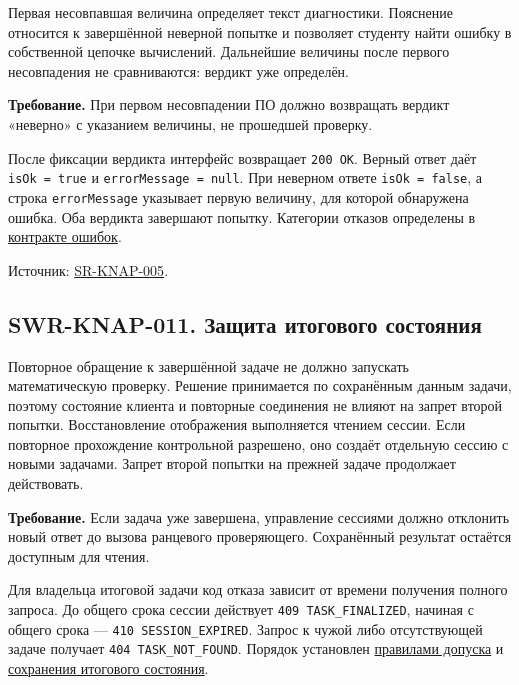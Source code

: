 \documentclass[12pt,a4paper]{article}
\begin{document}
\hypertarget{swr-knap-010-диагностика-неверной-величины}{}

\hypertarget{swr-knap-010}{}

Первая несовпавшая величина определяет текст диагностики. Пояснение относится к завершённой неверной попытке и позволяет студенту найти ошибку в собственной цепочке вычислений. Дальнейшие величины после первого несовпадения не сравниваются: вердикт уже определён.

\textbf{Требование.} При первом несовпадении ПО должно возвращать вердикт «неверно» с указанием величины, не прошедшей проверку.

После фиксации вердикта интерфейс возвращает \texttt{200\ OK}. Верный ответ даёт \texttt{isOk\ =\ true} и \texttt{errorMessage\ =\ null}. При неверном ответе \texttt{isOk\ =\ false}, а строка \texttt{errorMessage} указывает первую величину, для которой обнаружена ошибка. Оба вердикта завершают попытку. Категории отказов определены в {\href{DOC-06.2\_Сессии\_задач\_и\_планировщик.pdf\#коды-и-представление-ошибок}{контракте ошибок}}.

Источник: {\href{../04\_Системные\_требования/DOC-05\_Системные\_требования.pdf\#sr-knap-005}{SR-KNAP-005}}.

\subsection{SWR-KNAP-011. Защита итогового состояния}\label{swr-knap-011-ux437ux430ux449ux438ux442ux430-ux438ux442ux43eux433ux43eux432ux43eux433ux43e-ux441ux43eux441ux442ux43eux44fux43dux438ux44f}

\hypertarget{swr-knap-011-защита-итогового-состояния}{}

\hypertarget{swr-knap-011}{}

Повторное обращение к завершённой задаче не должно запускать математическую проверку. Решение принимается по сохранённым данным задачи, поэтому состояние клиента и повторные соединения не влияют на запрет второй попытки. Восстановление отображения выполняется чтением сессии. Если повторное прохождение контрольной разрешено, оно создаёт отдельную сессию с новыми задачами. Запрет второй попытки на прежней задаче продолжает действовать.

\textbf{Требование.} Если задача уже завершена, управление сессиями должно отклонить новый ответ до вызова ранцевого проверяющего. Сохранённый результат остаётся доступным для чтения.

Для владельца итоговой задачи код отказа зависит от времени получения полного запроса. До общего срока сессии действует \texttt{409 TASK\_\allowbreak{}FINALIZED}, начиная с общего срока --- \texttt{410 SESSION\_\allowbreak{}EXPIRED}. Запрос к чужой либо отсутствующей задаче получает \texttt{404 TASK\_\allowbreak{}NOT\_\allowbreak{}FOUND}. Порядок установлен {\href{DOC-06.2\_Сессии\_задач\_и\_планировщик.pdf\#swr-ses-008-проверка-допуска}{правилами допуска}} и {\href{DOC-06.2\_Сессии\_задач\_и\_планировщик.pdf\#swr-ses-013-сохранение-итогового-состояния}{сохранения итогового состояния}}.
\end{document}
